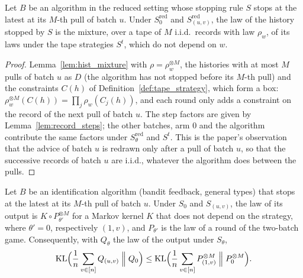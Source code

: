 \begin{lemma}
  \label{lem:record_representation}
  \leanok
  Let $B$ be an algorithm in the reduced setting whose stopping rule $S$ stops at the latest at its
  $M$-th pull of batch $u$. Under $S^{\mathrm{red}}_0$ and $S^{\mathrm{red}}_{(u, v)}$, the law of the
  history stopped by $S$ is the mixture, over a tape of $M$ i.i.d.\ records with law $\rho_w$, of
  its laws under the tape strategies $S^t$, which do not depend on $w$.
\end{lemma}

\begin{proof}
  \leanok
  Lemma~\ref{lem:hist_mixture} with $\rho = \rho_w^{\otimes M}$, the histories with at most $M$
  pulls of batch $u$ as $D$ (the algorithm has not stopped before its $M$-th pull) and the
  constraints $C(h)$ of Definition~\ref{def:tape_strategy}, which form a box: $\rho_w^{\otimes
  M}(C(h)) = \prod_j \rho_w(C_j(h))$, and each round only adds a constraint on the record of the next
  pull of batch $u$. The step factors are given by Lemma~\ref{lem:record_steps}; the other batches,
  arm $0$ and the algorithm contribute the same factors under $S^{\mathrm{red}}_\theta$ and $S^t$.
  This is the paper's observation that the advice of batch $u$ is redrawn only after a pull of
  batch $u$, so that the successive records of batch $u$ are i.i.d., whatever the algorithm does
  between the pulls.
\end{proof}

\begin{lemma}
  \label{lem:events_before_pulls}
  \leanok
  Let $B$ be an identification algorithm (bandit feedback, general types) that stops at the latest
  at its $M$-th pull of batch $u$. Under $S_0$ and $S_{(u, v)}$, the law of its output is
  $K \circ P_{\theta'}^{\otimes M}$ for a Markov kernel $K$ that does not depend on the strategy,
  where $\theta' = 0$, respectively $(1, v)$, and $P_{\theta'}$ is the law of a round of the
  two-batch game. Consequently, with $Q_\theta$ the law of the output under $S_\theta$,
  \[
    \mathrm{KL}\Bigl(\frac1n \sum_{v \in [n]} Q_{(u, v)} \Bigm\| Q_0\Bigr)
      \le \mathrm{KL}\Bigl(\frac1n \sum_{v \in [n]} P_{(1, v)}^{\otimes M} \Bigm\| P_0^{\otimes M}\Bigr).
  \]
\end{lemma}

